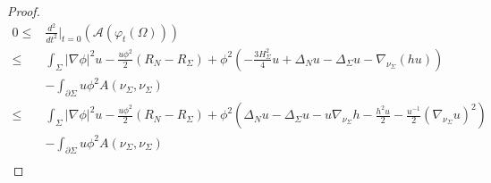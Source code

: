 \documentclass[10pt,a4paper]{amsart}
\begin{document}
\begin{proof}
		\begin{align*}
			0\leq &\frac{d^2}{dt^2}\Big\vert_{t=0}(\mathcal{A}(\varphi_t(\Omega)))\\
			\leq& \int_{\Sigma} |\nabla \phi|^2u  -\frac{u\phi^2}{2}(R_{N}-R_{\Sigma})+\phi^2(-\frac{3H^2_{\Sigma}}{4}u+ \Delta_N u-\Delta_{\Sigma}u-\nabla_{\nu_{\Sigma}} (hu))\\
			& -\int_{\partial \Sigma} u  \phi^2 A(\nu_{\Sigma},\nu_{\Sigma})\\
			\leq & \int_{\Sigma} |\nabla \phi|^2u  -\frac{u\phi^2}{2}(R_{N}-R_{\Sigma})+\phi^2(\Delta_N u-\Delta_{\Sigma}u-u\nabla_{\nu_{\Sigma}} h-\frac{h^2u}{2}-\frac{u^{-1}}{2}(\nabla_{\nu_{\Sigma}}u)^2)\\
			& -\int_{\partial \Sigma} u  \phi^2 A(\nu_{\Sigma},\nu_{\Sigma})\\
		\end{align*}
		
	\end{proof}
\end{document}

